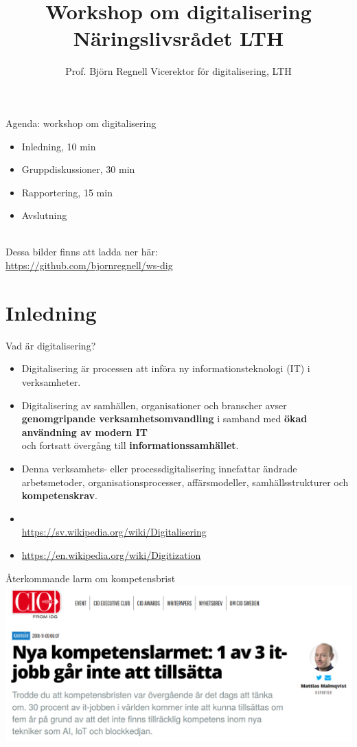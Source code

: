 \documentclass[aspectratio=169]{beamer}
\title[B. Regnell, \today]{\selectfont Workshop om digitalisering \\ Näringslivsrådet LTH }
\author[\href{https://github.com/bjornregnell/ws-dig}{github.com/bjornregnell/ws-dig}]{%
  Prof. Björn Regnell\newline
  Vicerektor för digitalisering, LTH}
\newcommand{\TitleSlide}{\begin{frame}[plain]\titlepage\end{frame}}
\newenvironment{Slide}[1]%
  {\begin{frame}[environment=Slide]{#1}}
  {\end{frame}}%
\begin{document}
\TitleSlide


\begin{Slide}{Agenda: workshop om digitalisering}
\begin{itemize}
    \item Inledning, 10 min 
    \item Gruppdiskussioner, 30 min 
    \item Rapportering, 15 min 
    \item Avslutning
\end{itemize}

~\\Dessa bilder finns att ladda ner här: \\ 
\url{https://github.com/bjornregnell/ws-dig}
\end{Slide}

\section{Inledning}
\begin{Slide}{Vad är digitalisering?}
  \begin{itemize}\small
      \item Digitalisering är processen att införa ny informationsteknologi (IT) i
      verksamheter. 
      \item Digitalisering av samhällen, organisationer och
      branscher avser \textbf{genomgripande verksamhetsomvandling} i samband
      med \textbf{ökad användning av modern IT} \\ och fortsatt övergång till
      \textbf{informationssamhället}. 
      
      \item Denna verksamhets- eller processdigitalisering innefattar ändrade arbetsmetoder,
      organisationsprocesser, affärsmodeller, samhällsstrukturer och
      \textbf{kompetenskrav}.
    \end{itemize}

    \begin{itemize}\small
      \item[]  ~\\\url{https://sv.wikipedia.org/wiki/Digitalisering}
      \item[]  \url{https://en.wikipedia.org/wiki/Digitization}
  \end{itemize}
\end{Slide}

\begin{Slide}{Återkommande larm om kompetensbrist}
\includegraphics[height=0.75\textheight]{../../img/kompetenslarm-cio}
\end{Slide}
\end{document}
